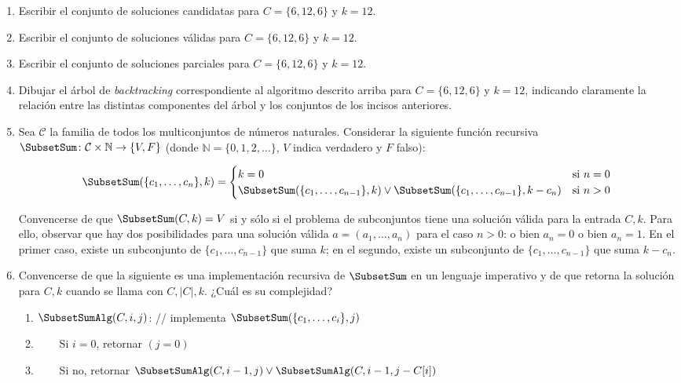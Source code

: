 \begin{enumerate}[label=$\alph*)$,ref=$\alph*)$]
 \item Escribir el conjunto de soluciones candidatas para $C = \{6, 12, 6\}$ y $k = 12$.
 \item Escribir el conjunto de soluciones válidas para $C = \{6, 12, 6\}$ y $k = 12$.
 \item Escribir el conjunto de soluciones parciales para $C = \{6, 12, 6\}$ y $k = 12$.
 \item Dibujar el árbol de \textit{backtracking} correspondiente al algoritmo descrito arriba para $C = \{6, 12, 6\}$ y $k = 12$, indicando claramente la relación entre las distintas componentes del árbol y los conjuntos de los incisos anteriores.
 \item Sea $\mathcal{C}$ la familia de todos los multiconjuntos de números naturales.  Considerar la siguiente función recursiva $\SubsetSum \colon \mathcal{C} \times \mathbb{N} \to \{V,F\}$ (donde $\mathbb{N} = \{ 0, 1, 2, \dots \}$, $V$ indica verdadero y $F$ falso):
 
 
$$
  \SubsetSum(\{c_1, \ldots, c_n\}, k) = \begin{cases}
   k = 0 & \text{si $n = 0$} \\
   \SubsetSum(\{c_1, \ldots, c_{n-1}\}, k) \lor \SubsetSum(\{c_1, \ldots, c_{n-1}\}, k - c_n) & \text{si $n > 0$}
  \end{cases}
$$
 
 
 Convencerse de que $\SubsetSum(C, k) = V$ si y sólo si el problema de subconjuntos tiene una solución válida para la entrada $C, k$.  Para ello, observar que hay dos posibilidades para una solución válida $a = (a_1, \ldots, a_n)$ para el caso $n > 0$: o bien $a_n = 0$ o bien $a_n = 1$.  En el primer caso, existe un subconjunto de $\{c_1, \ldots, c_{n-1}\}$ que suma $k$; en el segundo, existe un subconjunto de $\{c_1, \ldots, c_{n-1}\}$ que suma $k - c_n$.
 \label{sumaDeSubconjuntosFormRecBT}
 \item Convencerse de que la siguiente es una implementación recursiva de $\SubsetSum$ en un lenguaje imperativo y de que retorna la solución para $C, k$ cuando se llama con $C, |C|, k$. ¿Cuál es su complejidad?
 \label{sumaDeSubconjuntosAlgoBT}

 \begin{enumerate}
  \item $\SubsetSumAlg(C, i, j)$: // implementa $\SubsetSum(\{c_1, \ldots, c_i\}, j)$
  \item ~~~~Si $i = 0$, retornar $(j = 0)$
  \item ~~~~Si no, retornar $\SubsetSumAlg(C, i-1, j) \lor \SubsetSumAlg(C, i-1, j - C[i])$
 \end{enumerate}


\end{enumerate}
